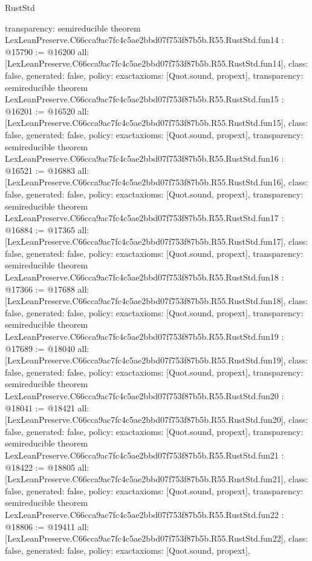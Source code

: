 \begin{lexlean}{RustStd}
\begin{coremodule}
{  transparency: semireducible
}
theorem LexLeanPreserve.C66cca9ac7fc4c5ae2bbd07f753f87b5b.R55.RustStd.fun14 : @15790 := @16200 {
  all: [LexLeanPreserve.C66cca9ac7fc4c5ae2bbd07f753f87b5b.R55.RustStd.fun14],
  class: false,
  generated: false,
  policy: exact{axioms: [Quot.sound, propext]},
  transparency: semireducible
}
theorem LexLeanPreserve.C66cca9ac7fc4c5ae2bbd07f753f87b5b.R55.RustStd.fun15 : @16201 := @16520 {
  all: [LexLeanPreserve.C66cca9ac7fc4c5ae2bbd07f753f87b5b.R55.RustStd.fun15],
  class: false,
  generated: false,
  policy: exact{axioms: [Quot.sound, propext]},
  transparency: semireducible
}
theorem LexLeanPreserve.C66cca9ac7fc4c5ae2bbd07f753f87b5b.R55.RustStd.fun16 : @16521 := @16883 {
  all: [LexLeanPreserve.C66cca9ac7fc4c5ae2bbd07f753f87b5b.R55.RustStd.fun16],
  class: false,
  generated: false,
  policy: exact{axioms: [Quot.sound, propext]},
  transparency: semireducible
}
theorem LexLeanPreserve.C66cca9ac7fc4c5ae2bbd07f753f87b5b.R55.RustStd.fun17 : @16884 := @17365 {
  all: [LexLeanPreserve.C66cca9ac7fc4c5ae2bbd07f753f87b5b.R55.RustStd.fun17],
  class: false,
  generated: false,
  policy: exact{axioms: [Quot.sound, propext]},
  transparency: semireducible
}
theorem LexLeanPreserve.C66cca9ac7fc4c5ae2bbd07f753f87b5b.R55.RustStd.fun18 : @17366 := @17688 {
  all: [LexLeanPreserve.C66cca9ac7fc4c5ae2bbd07f753f87b5b.R55.RustStd.fun18],
  class: false,
  generated: false,
  policy: exact{axioms: [Quot.sound, propext]},
  transparency: semireducible
}
theorem LexLeanPreserve.C66cca9ac7fc4c5ae2bbd07f753f87b5b.R55.RustStd.fun19 : @17689 := @18040 {
  all: [LexLeanPreserve.C66cca9ac7fc4c5ae2bbd07f753f87b5b.R55.RustStd.fun19],
  class: false,
  generated: false,
  policy: exact{axioms: [Quot.sound, propext]},
  transparency: semireducible
}
theorem LexLeanPreserve.C66cca9ac7fc4c5ae2bbd07f753f87b5b.R55.RustStd.fun20 : @18041 := @18421 {
  all: [LexLeanPreserve.C66cca9ac7fc4c5ae2bbd07f753f87b5b.R55.RustStd.fun20],
  class: false,
  generated: false,
  policy: exact{axioms: [Quot.sound, propext]},
  transparency: semireducible
}
theorem LexLeanPreserve.C66cca9ac7fc4c5ae2bbd07f753f87b5b.R55.RustStd.fun21 : @18422 := @18805 {
  all: [LexLeanPreserve.C66cca9ac7fc4c5ae2bbd07f753f87b5b.R55.RustStd.fun21],
  class: false,
  generated: false,
  policy: exact{axioms: [Quot.sound, propext]},
  transparency: semireducible
}
theorem LexLeanPreserve.C66cca9ac7fc4c5ae2bbd07f753f87b5b.R55.RustStd.fun22 : @18806 := @19411 {
  all: [LexLeanPreserve.C66cca9ac7fc4c5ae2bbd07f753f87b5b.R55.RustStd.fun22],
  class: false,
  generated: false,
  policy: exact{axioms: [Quot.sound, propext]},
}
\end{coremodule}
\end{lexlean}
